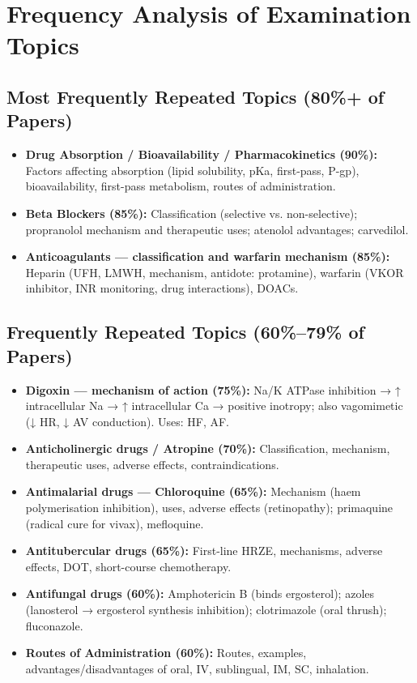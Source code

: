 \documentclass[11pt,a4paper]{article}
\begin{document}
\section{Frequency Analysis of Examination Topics}

\subsection{Most Frequently Repeated Topics (80\%+ of Papers)}
\begin{itemize}[leftmargin=*]
    \item \textbf{Drug Absorption / Bioavailability / Pharmacokinetics (90\%):} Factors affecting absorption (lipid solubility, pKa, first-pass, P-gp), bioavailability, first-pass metabolism, routes of administration.
    \item \textbf{Beta Blockers (85\%):} Classification (selective vs. non-selective); propranolol mechanism and therapeutic uses; atenolol advantages; carvedilol.
    \item \textbf{Anticoagulants --- classification and warfarin mechanism (85\%):} Heparin (UFH, LMWH, mechanism, antidote: protamine), warfarin (VKOR inhibitor, INR monitoring, drug interactions), DOACs.
\end{itemize}

\subsection{Frequently Repeated Topics (60\%--79\% of Papers)}
\begin{itemize}[leftmargin=*]
    \item \textbf{Digoxin --- mechanism of action (75\%):} Na/K ATPase inhibition → ↑ intracellular Na → ↑ intracellular Ca → positive inotropy; also vagomimetic (↓ HR, ↓ AV conduction). Uses: HF, AF.
    \item \textbf{Anticholinergic drugs / Atropine (70\%):} Classification, mechanism, therapeutic uses, adverse effects, contraindications.
    \item \textbf{Antimalarial drugs --- Chloroquine (65\%):} Mechanism (haem polymerisation inhibition), uses, adverse effects (retinopathy); primaquine (radical cure for vivax), mefloquine.
    \item \textbf{Antitubercular drugs (65\%):} First-line HRZE, mechanisms, adverse effects, DOT, short-course chemotherapy.
    \item \textbf{Antifungal drugs (60\%):} Amphotericin B (binds ergosterol); azoles (lanosterol → ergosterol synthesis inhibition); clotrimazole (oral thrush); fluconazole.
    \item \textbf{Routes of Administration (60\%):} Routes, examples, advantages/disadvantages of oral, IV, sublingual, IM, SC, inhalation.
\end{itemize}
\end{document}
